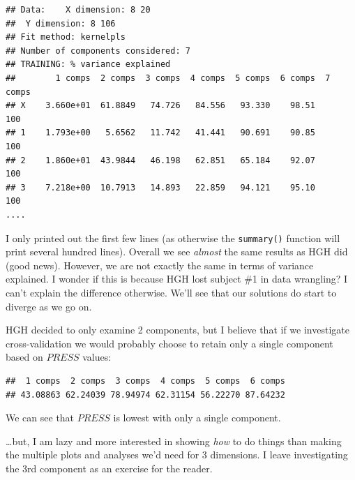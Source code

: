 \documentclass[
]{book}
\newenvironment{Shaded}{\begin{snugshade}}{\end{snugshade}}
\newcommand{\AttributeTok}[1]{\textcolor[rgb]{0.13,0.29,0.53}{#1}}
\newcommand{\CommentTok}[1]{\textcolor[rgb]{0.56,0.35,0.01}{\textit{#1}}}
\newcommand{\ConstantTok}[1]{\textcolor[rgb]{0.56,0.35,0.01}{#1}}
\newcommand{\DecValTok}[1]{\textcolor[rgb]{0.00,0.00,0.81}{#1}}
\newcommand{\FunctionTok}[1]{\textcolor[rgb]{0.13,0.29,0.53}{\textbf{#1}}}
\newcommand{\NormalTok}[1]{#1}
\newcommand{\OtherTok}[1]{\textcolor[rgb]{0.56,0.35,0.01}{#1}}
\newcommand{\SpecialCharTok}[1]{\textcolor[rgb]{0.81,0.36,0.00}{\textbf{#1}}}
\newcommand{\StringTok}[1]{\textcolor[rgb]{0.31,0.60,0.02}{#1}}
\begin{document}
\begin{verbatim}
## Data:    X dimension: 8 20 
##  Y dimension: 8 106
## Fit method: kernelpls
## Number of components considered: 7
## TRAINING: % variance explained
##        1 comps  2 comps  3 comps  4 comps  5 comps  6 comps  7 comps
## X    3.660e+01  61.8849   74.726   84.556   93.330    98.51      100
## 1    1.793e+00   5.6562   11.742   41.441   90.691    90.85      100
## 2    1.860e+01  43.9844   46.198   62.851   65.184    92.07      100
## 3    7.218e+00  10.7913   14.893   22.859   94.121    95.10      100
....
\end{verbatim}

I only printed out the first few lines (as otherwise the \texttt{summary()} function will print several hundred lines). Overall we see \emph{almost} the same results as HGH did (good news). However, we are not exactly the same in terms of variance explained. I wonder if this is because HGH lost subject \#1 in data wrangling? I can't explain the difference otherwise. We'll see that our solutions do start to diverge as we go on.

HGH decided to only examine 2 components, but I believe that if we investigate cross-validation we would probably choose to retain only a single component based on \(PRESS\) values:

\begin{Shaded}
\end{Shaded}

\begin{verbatim}
##  1 comps  2 comps  3 comps  4 comps  5 comps  6 comps 
## 43.08863 62.24039 78.94974 62.31154 56.22270 87.64232
\end{verbatim}

We can see that \(PRESS\) is lowest with only a single component.

\ldots but, I am lazy and more interested in showing \emph{how} to do things than making the multiple plots and analyses we'd need for 3 dimensions. I leave investigating the 3rd component as an exercise for the reader.
\end{document}
